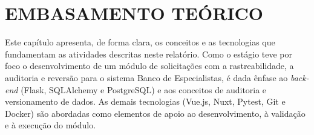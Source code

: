 


\chapter{EMBASAMENTO TEÓRICO}
\label{chap:embasamento-teorico}

Este capítulo apresenta, de forma clara, os conceitos e as tecnologias que
fundamentam as atividades descritas neste relatório. Como o estágio teve
por foco o desenvolvimento de um módulo de solicitações com a rastreabilidade, a
auditoria e reversão para o sistema Banco de Especialistas, é dada ênfase ao \textit{back-end}
(Flask, SQLAlchemy e PostgreSQL) e aos conceitos de auditoria e versionamento de dados.
As demais tecnologias (Vue.js, Nuxt, Pytest, Git e Docker) são abordadas como
elementos de apoio ao desenvolvimento, à validação e à execução do módulo.









